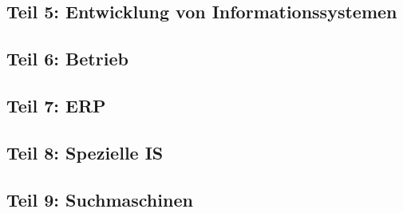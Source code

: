 \subsection{Teil 5: Entwicklung von Informationssystemen}

\subsection{Teil 6: Betrieb}

\subsection{Teil 7: ERP}

\subsection{Teil 8: Spezielle IS}

\subsection{Teil 9: Suchmaschinen}

